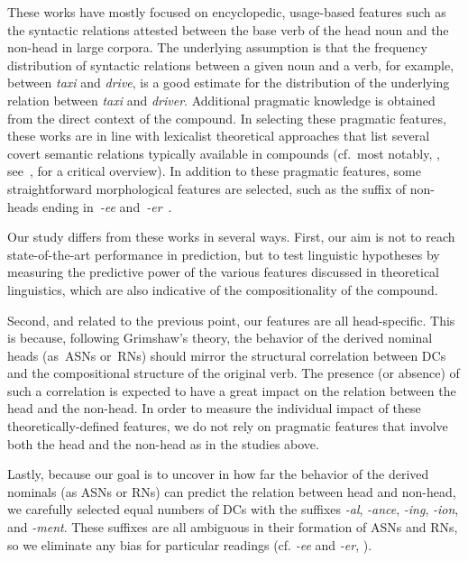 \documentclass[output=paper]{langsci/langscibook}
\begin{document}
These works have mostly focused on encyclopedic, usage-based features such as the syntactic relations attested between the base verb of the head noun 
and the non-head in large corpora. The underlying assumption is that the frequency distribution of syntactic relations between a given noun and a verb, for example, between \textit{taxi} and \textit{drive}, is a good estimate for the distribution of the underlying relation between \textit{taxi} and \textit{driver}. Additional pragmatic knowledge is obtained  from the direct context of the compound.
In selecting these pragmatic features, these works are in line with lexicalist theoretical approaches that list several covert semantic relations typically available in compounds (cf.\ most notably, \cite{levi:78}, see~\cite{fokkens:07}, for a critical overview). In addition to these pragmatic features, some 
straightforward morphological features are selected, such as the suffix of non-heads ending in~\textit{-ee} and~\textit{-er}~\citep{lapata:02}.

Our study differs from these works in several ways. First, our aim is not to reach state-of-the-art performance in prediction, but to  {test linguistic hypotheses by} measuring the predictive power of the various features discussed in theoretical linguistics, which are also indicative of the  {compositionality} of the compound. 

Second, and related to the previous point, our features are all head-specific. This is because,  following Grimshaw's theory, the behavior of the derived nominal heads (as~ASNs or~RNs) should mirror the structural correlation between DCs and the compositional structure of the original verb. The presence (or absence) of such a correlation is expected to have a great impact on the relation between the head and the non-head. In order to measure the individual impact of these theoretically-defined features, we do not rely on pragmatic features  {that involve both the head and the non-head} as in the studies above.
 

Lastly, because our goal is to uncover in how far the behavior of the derived nominals (as ASNs or RNs) can  predict the relation between head and non-head, we carefully selected  {equal numbers} of DCs with the suffixes \textit{-al}, \textit{-ance},  \textit{-ing},  \textit{-ion}, and  \textit{-ment}. These suffixes are all ambiguous in their formation of ASNs and RNs, so we eliminate any bias for particular readings (cf. \textit{-ee} and \textit{-er}, ).
\end{document}
